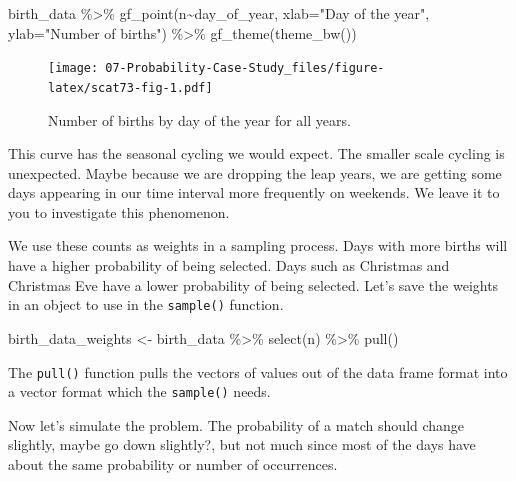 \documentclass[
]{book}
\newenvironment{Shaded}{\begin{snugshade}}{\end{snugshade}}
\newcommand{\AttributeTok}[1]{\textcolor[rgb]{0.77,0.63,0.00}{#1}}
\newcommand{\FunctionTok}[1]{\textcolor[rgb]{0.00,0.00,0.00}{#1}}
\newcommand{\NormalTok}[1]{#1}
\newcommand{\OtherTok}[1]{\textcolor[rgb]{0.56,0.35,0.01}{#1}}
\newcommand{\SpecialCharTok}[1]{\textcolor[rgb]{0.00,0.00,0.00}{#1}}
\newcommand{\StringTok}[1]{\textcolor[rgb]{0.31,0.60,0.02}{#1}}
\begin{document}
\begin{Shaded}
\begin{Highlighting}[]
\NormalTok{birth\_data }\SpecialCharTok{\%\textgreater{}\%}
  \FunctionTok{gf\_point}\NormalTok{(n}\SpecialCharTok{\textasciitilde{}}\NormalTok{day\_of\_year,}
          \AttributeTok{xlab=}\StringTok{"Day of the year"}\NormalTok{,}
          \AttributeTok{ylab=}\StringTok{"Number of births"}\NormalTok{) }\SpecialCharTok{\%\textgreater{}\%}
  \FunctionTok{gf\_theme}\NormalTok{(}\FunctionTok{theme\_bw}\NormalTok{())}
\end{Highlighting}
\end{Shaded}

\begin{figure}
\centering
\texttt{[image: 07-Probability-Case-Study\_files/figure-latex/scat73-fig-1.pdf]}
\caption{\label{fig:scat73-fig}Number of births by day of the year for all years.}
\end{figure}

This curve has the seasonal cycling we would expect. The smaller scale cycling is unexpected. Maybe because we are dropping the leap years, we are getting some days appearing in our time interval more frequently on weekends. We leave it to you to investigate this phenomenon.

We use these counts as weights in a sampling process. Days with more births will have a higher probability of being selected. Days such as Christmas and Christmas Eve have a lower probability of being selected. Let's save the weights in an object to use in the \texttt{sample()} function.

\begin{Shaded}
\begin{Highlighting}[]
\NormalTok{birth\_data\_weights }\OtherTok{\textless{}{-}}\NormalTok{ birth\_data }\SpecialCharTok{\%\textgreater{}\%}
  \FunctionTok{select}\NormalTok{(n) }\SpecialCharTok{\%\textgreater{}\%}
  \FunctionTok{pull}\NormalTok{()}
\end{Highlighting}
\end{Shaded}

The \texttt{pull()} function pulls the vectors of values out of the data frame format into a vector format which the \texttt{sample()} needs.

Now let's simulate the problem. The probability of a match should change slightly, maybe go down slightly?, but not much since most of the days have about the same probability or number of occurrences.
\end{document}
